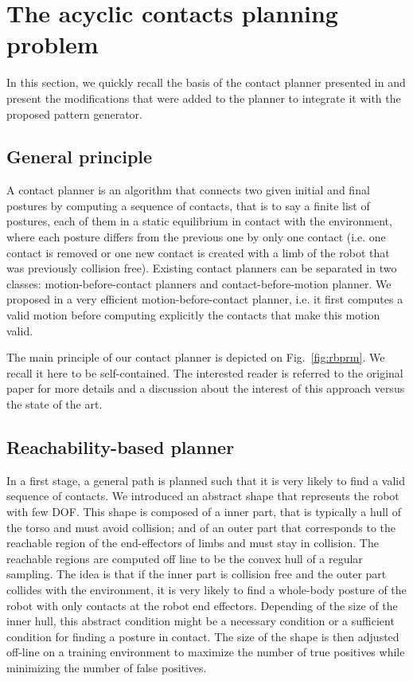 \renewcommand{\widthValue}{0.13\linewidth}

\section{The acyclic contacts planning problem}
\label{sec:planer}

In this section, we quickly recall the basis of the contact planner presented in \cite{tonneau_isrr15} and present the modifications that were added to the planner to integrate it with the proposed pattern generator.

\subsection{General principle}
A contact planner is an algorithm that connects two given initial and final postures by computing a sequence of contacts, that is to say a finite list of postures, each of them in a static equilibrium in contact with the environment, where each posture differs from the previous one by only one contact (i.e. one contact is removed or one new contact is created with a limb of the robot that was previously collision free). Existing contact planners can be separated in two classes: motion-before-contact planners and contact-before-motion planner. We proposed in \cite{tonneau_isrr15} a very efficient motion-before-contact planner, i.e. it first computes a valid motion before computing explicitly the contacts that make this motion valid.

The main principle of our contact planner is depicted on Fig.~\ref{fig:rbprm}. We recall it here to be self-contained. The interested reader is referred to the original paper for more details and a discussion about the interest of this approach versus the state of the art.

\subsection{Reachability-based planner}

In a first stage, a general path is planned such that it is very likely to find a valid sequence of contacts. We introduced an abstract shape that represents the robot with few DOF. This shape is composed of a inner part, that is typically a hull of the torso and must avoid collision; and of an outer part that corresponds to the reachable region of the end-effectors of limbs and must stay in collision. The reachable regions are computed off line to be the convex hull of a regular sampling. The idea is that if the inner part is collision free and the outer part collides with the environment, it is very likely to find a whole-body posture of the robot with only contacts at the robot end effectors. Depending of the size of the inner hull, this abstract condition might be a necessary condition or a sufficient condition for finding a posture in contact. The size of the shape is then adjusted off-line on a training environment to maximize the number of true positives while minimizing the number of false positives.

